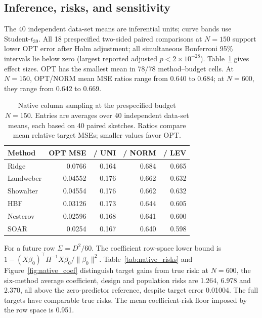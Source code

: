 \documentclass[11pt,a4paper,leqno]{article}
\numberwithin{equation}{section}
\numberwithin{figure}{section}
\numberwithin{table}{section}
\theoremstyle{plain}
\theoremstyle{definition}
\theoremstyle{remark}
\begin{document}
\subsection{Inference, risks, and sensitivity}
The 40 independent data-set means are inferential units; curve bands use
Student-$t_{39}$. All 18 prespecified two-sided paired comparisons at
$N=150$ support lower OPT error after Holm adjustment; all simultaneous
Bonferroni 95\% intervals lie below zero (largest reported adjusted
$p<2\times10^{-28}$). Table~\ref{tab:native_primary} gives
effect sizes. OPT has the smallest mean in 78/78 method--budget cells.
At $N=150$, OPT/NORM mean MSE ratios range from 0.640 to 0.684;
at $N=600$, they range from 0.642 to 0.669.

\begin{table}[!htbp]
\centering\small
\caption{Native column sampling at the prespecified budget $N=150$. Entries are averages over 40 independent data-set means, each based on 40 paired sketches. Ratios compare mean relative target MSEs; smaller values favor OPT.}
\label{tab:native_primary}
\begin{tabular}{lrrrr}\toprule
Method & OPT MSE & / UNI & / NORM & / LEV \\\midrule
Ridge & 0.0766 & 0.164 & 0.684 & 0.665 \\
Landweber & 0.04552 & 0.176 & 0.662 & 0.632 \\
Showalter & 0.04554 & 0.176 & 0.662 & 0.632 \\
HBF & 0.03126 & 0.173 & 0.644 & 0.605 \\
Nesterov & 0.02596 & 0.168 & 0.641 & 0.600 \\
SOAR & 0.0254 & 0.167 & 0.640 & 0.598 \\
\bottomrule\end{tabular}
\end{table}

For a future row $\Sigma=D^2/60$. The coefficient row-space lower bound
is $1-(X\beta_0)^\top H^{-1}X\beta_0/\|\beta_0\|^2$.
Table~\ref{tab:native_risks} and Figure~\ref{fig:native_coef} distinguish
target gains from true risk: at $N=600$, the six-method average coefficient,
design and population risks are 1.264, 6.978 and 2.370, all above the
zero-predictor reference, despite target error 0.01004. The full targets
have comparable true risks. The mean coefficient-risk floor imposed by
the row space is 0.951.
\end{document}
